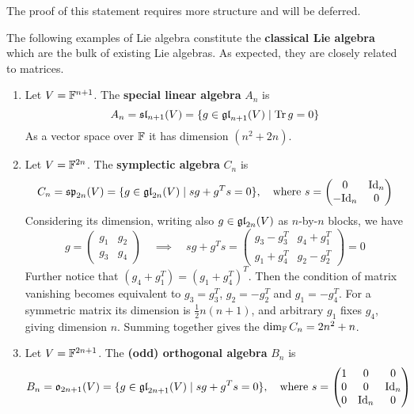 \documentclass{article}
\begin{document}
\textstart
The proof of this statement requires more structure and will be deferred.


\begin{example}\label{ex: classical Lie algebra}
    The following examples of Lie algebra constitute the \textbf{classical Lie algebra} which are the bulk of existing Lie algebras. As expected, they are closely related to matrices.
    \begin{enumerate}
        \item Let $V = \mathbb{F}^{n+1}$. The \textbf{special linear algebra} $A_n$ is
        \[
            A_n = \mathfrak{sl}_{n+1}(V) = \{ g \in \mathfrak{gl}_{n+1}(V) \mid \operatorname{Tr}{g} = 0 \}
        \]
        As a vector space over $\mathbb{F}$ it has dimension $(n^2 + 2n)$.
        \item Let $V = \mathbb{F}^{2n}$. The \textbf{symplectic algebra} $C_n$ is
        \[
            C_n = \mathfrak{sp}_{2n}(V) = \{ g \in \mathfrak{gl}_{2n}(V) \mid sg + g^T s = 0 \}, \quad \text{where } s = \begin{pmatrix} 0 & \mathrm{Id}_n \\ -\mathrm{Id}_n & 0 \end{pmatrix}
        \]
        Considering its dimension, writing also $g \in \mathfrak{gl}_{2n}(V)$ as $n$-by-$n$ blocks, we have
        \[
            g = 
            \left(\begin{array}{c|c}
                g_1 & g_2 \\
                \hline
                g_3 & g_4
            \end{array}\right)
            \quad
            \implies
            \quad
            sg + g^T s = 
            \left(\begin{array}{c|c}
                g_3 - g_3^T & g_4 + g_1^T \\
                \hline
                g_1 + g_4^T & g_2 - g_2^T
            \end{array}\right)
            = 0
        \]
        Further notice that $(g_4 + g_1^T) = (g_1 + g_4^T)^T$. Then the condition of matrix vanishing becomes equivalent to $g_3 = g_3^T$, $g_2 = -g_2^T$ and $g_1 = -g_4^T$. For a symmetric matrix its dimension is $\frac{1}{2}n(n+1)$, and arbitrary $g_1$ fixes $g_4$, giving dimension $n$. Summing together gives the $\dim_{\mathbb{F}} C_n = 2n^2 + n$.
        \item Let $V = \mathbb{F}^{2n+1}$. The \textbf{(odd) orthogonal algebra} $B_n$ is
        \[
            B_n = \mathfrak{o}_{2n+1}(V) = \{ g \in \mathfrak{gl}_{2n+1}(V) \mid sg + g^T s = 0 \}, \quad \text{where } s = \begin{pmatrix} 1 & 0 & 0 \\ 0 & 0 & \mathrm{Id}_n \\ 0 & \mathrm{Id}_n & 0 \end{pmatrix}
\]
\end{enumerate}
\end{example}
\end{document}

